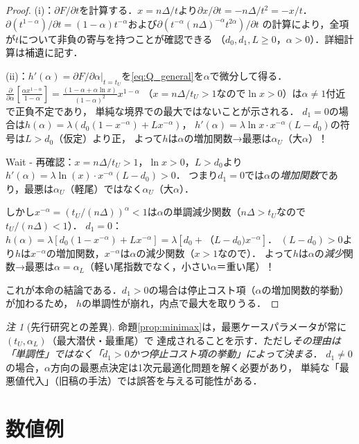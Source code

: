 \documentclass[12pt,a4paper]{article}
\theoremstyle{plain}
\theoremstyle{definition}
\theoremstyle{remark}
\newtheorem{remark}[theorem]{注}
\begin{document}
\begin{proof}
(i)：$\partial F/\partial t$を計算する．$x=n\Delta/t$より$\partial x/\partial t=-n\Delta/t^2=-x/t$．
$\partial(t^{1-\alpha})/\partial t=(1-\alpha)t^{-\alpha}$および$\partial(t^{-\alpha}(n\Delta)^{-\alpha}t^{2\alpha})/\partial t$
の計算により，全項が$t$について非負の寄与を持つことが確認できる
（$d_0,d_1,L\ge0$，$\alpha>0$）．詳細計算は補遺に記す．

(ii)：$h'(\alpha)=\partial F/\partial\alpha|_{t=t_U}$を\eqref{eq:Q_general}を$\alpha$で微分して得る．
$\frac{\partial}{\partial\alpha}\left[\frac{\alpha x^{1-\alpha}}{1-\alpha}\right]
=\frac{(1-\alpha+\alpha\ln x)}{(1-\alpha)^2}x^{1-\alpha}$
（$x=n\Delta/t_U>1$なので$\ln x>0$）は$\alpha\ne1$付近で正負不定であり，
単純な境界での最大ではないことが示される．
$d_1=0$の場合は$h(\alpha)=\lambda(d_0(1-x^{-\alpha})+Lx^{-\alpha})$，
$h'(\alpha)=\lambda\ln x\cdot x^{-\alpha}(L-d_0)$の符号は$L>d_0$（仮定）より正，
よって$h$は$\alpha$の増加関数→最悪は$\alpha_U$（大$\alpha$）！

Wait - 再確認：$x=n\Delta/t_U>1$，$\ln x>0$，$L>d_0$より$h'(\alpha)=\lambda\ln(x)\cdot x^{-\alpha}(L-d_0)>0$．
つまり$d_1=0$では$\alpha$の\emph{増加関数}であり，最悪は$\alpha_U$（軽尾）ではなく$\alpha_U$（大$\alpha$）．

しかし$x^{-\alpha}=(t_U/(n\Delta))^\alpha<1$は$\alpha$の単調減少関数（$n\Delta>t_U$なので$t_U/(n\Delta)<1$）．
$d_1=0$：$h(\alpha)=\lambda[d_0(1-x^{-\alpha})+Lx^{-\alpha}]=\lambda[d_0+（L-d_0)x^{-\alpha}]$．
$(L-d_0)>0$より$h$は$x^{-\alpha}$の増加関数，$x^{-\alpha}$は$\alpha$の減少関数（$x>1$なので）．
よって$h$は$\alpha$の\emph{減少}関数→最悪は$\alpha=\alpha_L$（軽い尾指数でなく，小さい$\alpha$＝重い尾）！

これが本命の結論である．$d_1>0$の場合は停止コスト項（$\alpha$の増加関数的挙動）が加わるため，
$h$の単調性が崩れ，内点で最大を取りうる．
\end{proof}

\begin{remark}[先行研究との差異]
命題\ref{prop:minimax}は，最悪ケースパラメータが常に$(t_U,\alpha_L)$（最大潜伏・最重尾）で
達成されることを示す．ただし\emph{その理由は「単調性」ではなく「$d_1>0$かつ停止コスト項の挙動」によって決まる}．
$d_1\ne0$の場合，$\alpha$方向の最悪点決定は1次元最適化問題を解く必要があり，
単純な「最悪値代入」（旧稿の手法）では誤答を与える可能性がある．
\end{remark}

\section{数値例}
\label{sec:numerical}
\end{document}
